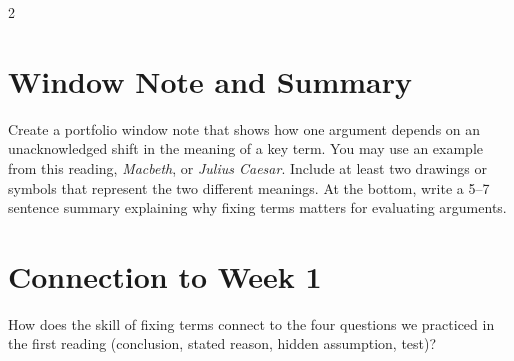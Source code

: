 \documentclass[12pt]{article}
\begin{document}
\begin{multicols}{2}
\section*{Window Note and Summary}
Create a portfolio window note that shows how one argument depends on an unacknowledged shift in the meaning of a key term. You may use an example from this reading, \textit{Macbeth}, or \textit{Julius Caesar}. Include at least two drawings or symbols that represent the two different meanings. At the bottom, write a 5--7 sentence summary explaining why fixing terms matters for evaluating arguments.

\section*{Connection to Week 1}
How does the skill of fixing terms connect to the four questions we practiced in the first reading (conclusion, stated reason, hidden assumption, test)?

\end{multicols}
\end{document}
